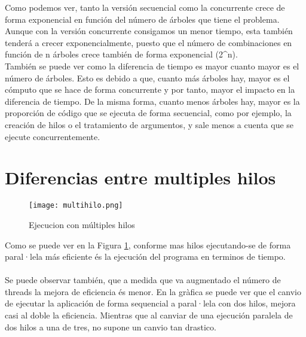 \documentclass{article}
\begin{document}
Como podemos ver, tanto la versión secuencial como la concurrente 
crece de forma exponencial en función del número de árboles que tiene el problema.
Aunque con la versión concurrente consigamos un menor tiempo, esta también 
tenderá a crecer exponencialmente, puesto que el número de combinaciones
en función de n árboles crece también de forma exponencial (2^n).\\

También se puede ver como la diferencia de tiempo es mayor cuanto mayor es
el número de árboles. Esto es debido a que, cuanto más árboles hay, mayor es
el cómputo que se hace de forma concurrente y por tanto, mayor el impacto en
la diferencia de tiempo. De la misma forma, cuanto menos árboles hay, mayor es 
la proporción de código que se ejecuta de forma secuencial, como por ejemplo,
la creación de hilos o el tratamiento de argumentos, y sale menos a cuenta 
que se ejecute concurrentemente.

\section{Diferencias entre multiples hilos}
\begin{figure}[hbt!]
  \texttt{[image: multihilo.png]}
  \caption{Ejecucion con múltiples hilos}
  \label{fig:multhilos}
\end{figure}

Como se puede ver en la Figura \ref{fig:multhilos}, conforme mas hilos ejecutando-se de forma paral·lela más eficiente és la ejecución del programa en terminos de tiempo.
\\\\
Se puede observar también, que a medida que va augmentado el número de threads la mejora de eficiencia és menor. En la gràfica se puede ver que el canvio de ejecutar la aplicación de forma sequencial a paral·lela con dos hilos, mejora casi al doble la eficiencia. Mientras que al canviar de una ejecución paralela de dos hilos a una de tres, no supone un canvio tan drastico.\\
\end{document}
